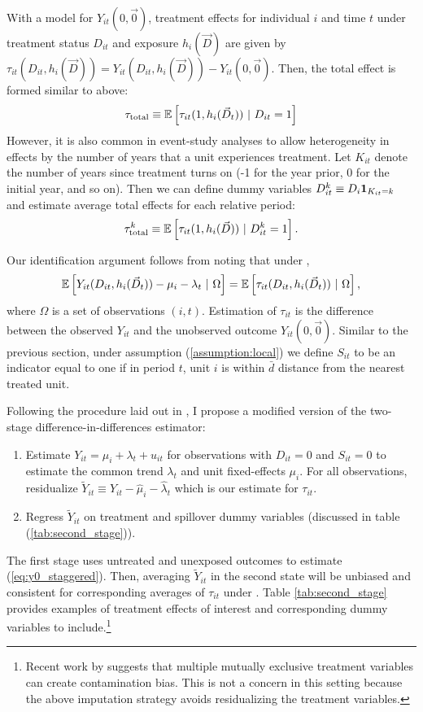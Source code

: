 \documentclass[11pt]{article}
\begin{document}
With a model for $Y_{it}(0, \vec{0})$, treatment effects for individual $i$ and time $t$ under treatment status $D_{it}$ and exposure $h_i(\vec{D})$ are given by $\tau_{it}(D_{it}, h_i(\vec{D})) = Y_{it}(D_{it}, h_i(\vec{D})) - Y_{it}(0, \vec{0})$. Then, the total effect is formed similar to above:
\[
    \tau_{\text{total}} \equiv \mathbb{E}\left[ \tau_{it}(1, h_i(\vec{D}_t)) \ \vert \ D_{it} = 1\right]
\]
However, it is also common in event-study analyses to allow heterogeneity in effects by the number of years that a unit experiences treatment. Let $K_{it}$ denote the number of years since treatment turns on (-1 for the year prior, 0 for the initial year, and so on). Then we can define dummy variables $D_{it}^k \equiv D_{i} \mathbf{1}_{K_{it} = k}$ and estimate average total effects for each relative period: 
\[
    \tau_{\text{total}}^k \equiv \mathbb{E}\left[ \tau_{it}(1, h_i(\vec{D})) \ \vert \ D_{it}^k = 1\right].
\]

Our identification argument follows from noting that under ,
$$
  \expec{Y_{it}(D_{it}, h_i(\vec{D}_t)) - \mu_i - \lambda_t \ | \ \Omega} = \expec{\tau_{it}(D_{it}, h_i(\vec{D}_t)) \ | \ \Omega},
$$
where $\Omega$ is a set of observations $(i, t)$. Estimation of $\tau_{it}$ is the difference between the observed $Y_{it}$ and the unobserved outcome $Y_{it}(0, \vec{0})$. Similar to the previous section, under assumption (\ref{assumption:local}) we define $S_{it}$ to be an indicator equal to one if in period $t$, unit $i$ is within $\bar{d}$ distance from the nearest treated unit. 

Following the procedure laid out in \citet{Gardner_2021}, I propose a modified version of the two-stage difference-in-differences estimator: 
\begin{enumerate}
    \item Estimate $Y_{it} = \mu_i + \lambda_t + u_{it}$ for observations with $D_{it} = 0$ and $S_{it} = 0$ to estimate the common trend $\lambda_t$ and unit fixed-effects $\mu_i$. For all observations, residualize $\tilde{Y}_{it} \equiv Y_{it} - \hat{\mu}_i - \hat{\lambda}_t$ which is our estimate for $\tau_{it}$.
    
    \item Regress $\tilde{Y}_{it}$ on treatment and spillover dummy variables (discussed in table (\ref{tab:second_stage})).
\end{enumerate}

The first stage uses untreated and unexposed outcomes to estimate (\ref{eq:y0_staggered}). Then, averaging $\tilde{Y}_{it}$ in the second state will be unbiased and consistent for corresponding averages of $\tau_{it}$ under . Table \ref{tab:second_stage} provides examples of treatment effects of interest and corresponding dummy variables to include.\footnote{Recent work by \citet{goldsmith2022contamination} suggests that multiple mutually exclusive treatment variables can create contamination bias. This is not a concern in this setting because the above imputation strategy avoids residualizing the treatment variables.}
\end{document}
